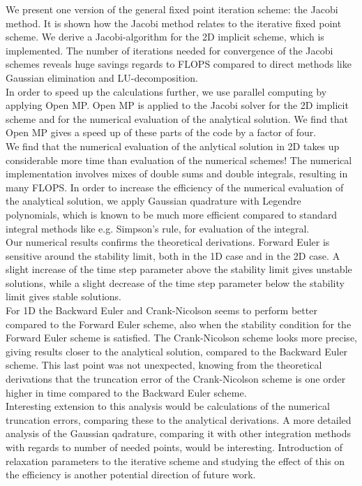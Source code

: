\documentclass{article}
\begin{document}
We present one version of the general fixed point iteration scheme: the Jacobi method. It is shown how the Jacobi method relates to the iterative fixed point scheme. We derive a Jacobi-algorithm for the 2D implicit scheme, which is implemented. The number of iterations needed for convergence of the Jacobi schemes reveals huge savings regards to FLOPS compared to direct methods like Gaussian elimination and LU-decomposition.\\

In order to speed up the calculations further, we use parallel computing by applying Open MP. Open MP is applied to the Jacobi solver for the 2D implicit scheme and for the numerical evaluation of the analytical solution. We find that Open MP gives a speed up of these parts of the code by a factor of four.\\

We find that the numerical evaluation of the anlytical solution in 2D takes up considerable more time than evaluation of the numerical schemes! The numerical implementation involves mixes of double sums and double integrals, resulting in many FLOPS. In order to increase the efficiency of the numerical evaluation of the analytical solution, we apply Gaussian quadrature with Legendre polynomials, which is known to be much more efficient compared to standard integral methods like e.g. Simpson's rule, for evaluation of the integral. \\

Our numerical results confirms the theoretical derivations. Forward Euler is sensitive around the stability limit, both in the 1D case and in the 2D case. A slight increase of the time step parameter above the stability limit gives unstable solutions, while a slight decrease of the time step parameter below the stability limit gives stable solutions.\\

For 1D the Backward Euler and Crank-Nicolson seems to perform better compared to the Forward Euler scheme, also when the stability condition for the Forward Euler scheme is satisfied. The Crank-Nicolson scheme looks more precise, giving results closer to the analytical solution, compared to the Backward Euler scheme. This last point was not unexpected, knowing from the theoretical derivations that the truncation error of the Crank-Nicolson scheme is one order higher in time compared to the Backward Euler scheme.\\

Interesting extension to this analysis would be calculations of the numerical truncation errors, comparing these to the analytical derivations. A more detailed analysis of the Gaussian qadrature, comparing it with other integration methods with regards to number of needed points, would be interesting. Introduction of relaxation parameters to the iterative scheme and studying the effect of this on the efficiency is another potential direction of future work.
\end{document}
